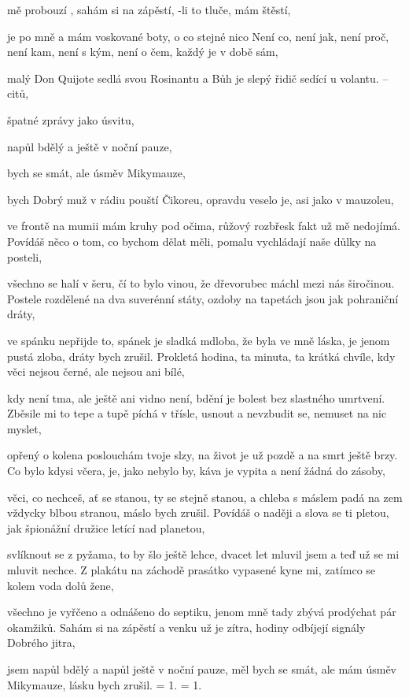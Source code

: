 
\zs
{} mě probouzí , sahám si na zápěs{tí},
-li to  tluče,  mám  štěstí,

 je po mně a  mám voskované bo{ty},
o co  stejné   nico
\ks
\zs
Není co, není jak, není proč, není kam,
není s kým, není o čem, každý je v době sám,

malý Don Quijote sedlá svou Rosinantu
a Bůh je slepý řidič sedící u volantu.
\ks
\zr
{}  --   citů,

špatné zprávy  jako   úsvitu,

 napůl bdělý a  ještě v noční pauze,

 bych se smát, ale  úsměv Mikymauze,

 bych    
\kr
\zs
Dobrý muž v rádiu pouští Čikoreu,
opravdu veselo je, asi jako v mauzoleu,

ve frontě na mumii mám kruhy pod očima,
růžový rozbřesk fakt už mě nedojímá.
\ks
\zs
Povídáš něco o tom, co bychom dělat měli,
pomalu vychládají naše důlky na posteli,

všechno se halí v šeru, čí to bylo vinou,
že dřevorubec máchl mezi nás širočinou.
\ks
\zr
Postele rozdělené na dva suverénní státy,
ozdoby na tapetách jsou jak pohraniční dráty,

ve spánku nepřijde to, spánek je sladká mdloba,
že byla ve mně láska, je jenom pustá zloba,
dráty bych zrušil.
\kr
\zs
Prokletá hodina, ta minuta, ta krátká chvíle,
kdy věci nejsou černé, ale nejsou ani bílé,

kdy není tma, ale ještě ani vidno není,
bdění je bolest bez slastného umrtvení.
\ks
\zs
Zběsile mi to tepe a tupě píchá v třísle,
usnout a nevzbudit se, nemuset na nic myslet,

opřený o kolena poslouchám tvoje slzy,
na život je už pozdě a na smrt ještě brzy.
\ks
\zr
Co bylo kdysi včera, je, jako nebylo by,
káva je vypita a není žádná do zásoby,

věci, co nechceš, ať se stanou, ty se stejně stanou,
a chleba s máslem padá na zem vždycky blbou stranou,
máslo bych zrušil.
\kr
\zs
Povídáš o naději a slova se ti pletou,
jak špionážní družice letící nad planetou,

svlíknout se z pyžama, to by šlo ještě lehce,
dvacet let mluvil jsem a teď už se mi mluvit nechce.
\ks
\zs
Z plakátu na záchodě prasátko vypasené
kyne mi, zatímco se kolem voda dolů žene,

všechno je vyřčeno a odnášeno do septiku,
jenom mně tady zbývá prodýchat pár okamžiků.
\ks
\zr
Sahám si na zápěstí a venku už je zítra,
hodiny odbíjejí signály Dobrého jitra,

jsem napůl bdělý a napůl ještě v noční pauze,
měl bych se smát, ale mám úsměv Mikymauze,
lásku bych zrušil.
\kr
\zs
= 1.
\ks
\zs
= 1.
\ks
\kp






